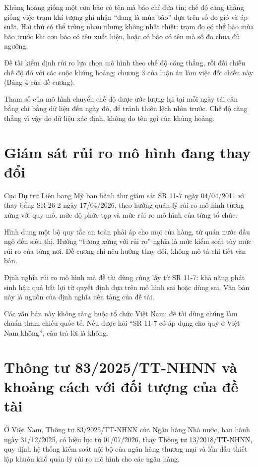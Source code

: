 Khủng hoảng giống một cơn bão có tên mà báo chí đưa tin; chế độ căng thẳng giống việc trạm khí tượng ghi nhận “đang là mùa bão” dựa trên số đo gió và áp suất. Hai thứ có thể trùng nhau nhưng không nhất thiết: trạm đo có thể báo mùa bão trước khi cơn bão có tên xuất hiện, hoặc có bão có tên mà số đo chưa đủ ngưỡng.

Đề tài kiểm định rủi ro lựa chọn mô hình theo chế độ căng thẳng, rồi đối chiếu chế độ đó với các cuộc khủng hoảng; chương 3 của luận án làm việc đối chiếu này (Bảng 4 của đề cương).

Tham số của mô hình chuyển chế độ được ước lượng lại tại mỗi ngày tái cân bằng chỉ bằng dữ liệu đến ngày đó, để tránh thiên lệch nhìn trước. Chế độ căng thẳng vì vậy do dữ liệu xác định, không do tên gọi của khủng hoảng.

\section{Giám sát rủi ro mô hình đang thay đổi}

Cục Dự trữ Liên bang Mỹ ban hành thư giám sát SR 11-7 ngày 04/04/2011 và thay bằng SR 26-2 ngày 17/04/2026, theo hướng quản lý rủi ro mô hình tương xứng với quy mô, mức độ phức tạp và mức rủi ro mô hình của từng tổ chức.

Hình dung một bộ quy tắc an toàn phải áp cho mọi cửa hàng, từ quán nước đầu ngõ đến siêu thị. Hướng “tương xứng với rủi ro” nghĩa là mức kiểm soát tùy mức rủi ro của từng nơi. Đề cương chỉ nêu hướng thay đổi, không mô tả chi tiết văn bản.

Định nghĩa rủi ro mô hình mà đề tài dùng cũng lấy từ SR 11-7: khả năng phát sinh hậu quả bất lợi từ quyết định dựa trên mô hình sai hoặc dùng sai. Văn bản này là nguồn của định nghĩa nền tảng của đề tài.

Các văn bản này không ràng buộc tổ chức Việt Nam; đề tài dùng chúng làm chuẩn tham chiếu quốc tế. Nếu được hỏi “SR 11-7 có áp dụng cho quỹ ở Việt Nam không”, câu trả lời là không.

\section{Thông tư 83/2025/TT-NHNN và khoảng cách với đối tượng của đề tài}

Ở Việt Nam, Thông tư 83/2025/TT-NHNN của Ngân hàng Nhà nước, ban hành ngày 31/12/2025, có hiệu lực từ 01/07/2026, thay Thông tư 13/2018/TT-NHNN, quy định hệ thống kiểm soát nội bộ của ngân hàng thương mại và lần đầu thiết lập khuôn khổ quản lý rủi ro mô hình cho các ngân hàng.


